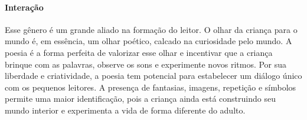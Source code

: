 \documentclass[11pt]{extarticle}
\begin{document}
\paragraph{Interação} Esse gênero é um grande aliado na formação do leitor. O olhar da criança para o mundo é, em essência, um olhar poético, calcado na curiosidade pelo mundo. A poesia é a forma perfeita de valorizar esse olhar e incentivar que a criança brinque com as palavras, observe os sons e experimente novos ritmos. Por sua liberdade e criatividade, a poesia tem potencial para estabelecer um diálogo único com os pequenos leitores. A presença de fantasias, imagens, repetição e símbolos permite uma maior identificação, pois a criança ainda está construindo seu mundo interior e experimenta a vida de forma diferente do adulto. 


\end{document}
